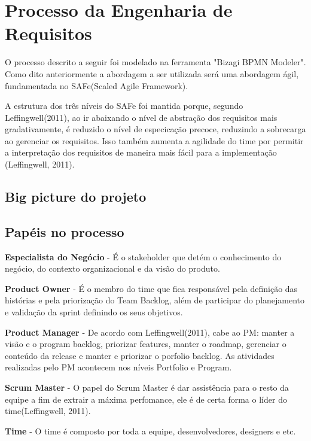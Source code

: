 \chapter[Processo da Engenharia de Requisitos]{Processo da Engenharia de Requisitos}
O processo descrito a seguir foi modelado na ferramenta "Bizagi BPMN Modeler". Como dito anteriormente a abordagem a ser utilizada será uma abordagem ágil, fundamentada no SAFe(Scaled Agile Framework).

A estrutura dos três níveis do SAFe foi mantida porque, segundo Leffingwell(2011), ao ir abaixando o nível de abstração dos requisitos mais gradativamente, é reduzido o nível de especicação precoce, reduzindo a sobrecarga ao gerenciar os requisitos. Isso também aumenta a agilidade do time por permitir a interpretação dos requisitos de maneira mais fácil para a implementação (Leffingwell, 2011).
\section{Big picture do projeto}
\section{Papéis no processo}
\item \textbf{Especialista do Negócio} - É o stakeholder que detém o conhecimento do negócio, do contexto organizacional e da visão do produto.	
\item \textbf{Product Owner} - É o membro do time que fica responsável pela definição das histórias e pela priorização do Team Backlog, além de participar do planejamento e validação da sprint definindo os seus objetivos.
\item \textbf{Product Manager} - De acordo com Leffingwell(2011), cabe ao PM: manter a visão e o program backlog, priorizar features, manter o roadmap, gerenciar o conteúdo da release e manter e priorizar o porfolio backlog. As atividades realizadas pelo PM acontecem nos níveis Portfolio e Program.
\item \textbf{Scrum Master} - O papel do Scrum Master é dar assistência para o resto da equipe a fim de extrair a máxima perfomance, ele é de certa forma o líder do time(Leffingwell, 2011).
\item \textbf{Time} - O time é composto por toda a equipe, desenvolvedores, designers e etc.
